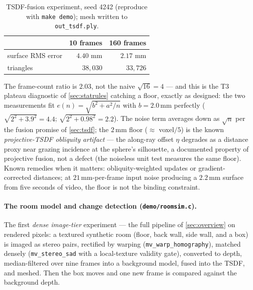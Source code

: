 \documentclass[11pt]{article}
\theoremstyle{definition}
\newcommand{\code}[1]{\texttt{#1}}
\begin{document}
\begin{table}[ht]
\centering
\begin{tabular}{lrr}
\toprule
 & 10 frames & 160 frames \\
\midrule
surface RMS error & $4.40$ mm & $2.17$ mm \\
triangles         & $38{,}030$ & $33{,}726$ \\
\bottomrule
\end{tabular}
\caption{TSDF-fusion experiment, seed 4242 (reproduce with
\code{make demo}); mesh written to \code{out\_tsdf.ply}.}
\label{tab:tsdfresults}
\end{table}

The frame-count ratio is $2.03$, not the naive $\sqrt{16}=4$ --- and
this is the T3 plateau diagnostic of \autoref{sec:statrules} catching a
floor, exactly as designed: the two measurements fit
$e(n)=\sqrt{b^2+a^2/n}$ with $b=2.0$\,mm perfectly
($\sqrt{2^2+3.9^2}=4.4$; $\sqrt{2^2+0.98^2}=2.2$). The noise term
averages down as $\sqrt n$ per the fusion promise of
\autoref{sec:tsdf}; the $2$\,mm floor ($\approx$ voxel$/5$) is the
known \emph{projective-TSDF obliquity artifact} --- the along-ray
offset $\eta$ degrades as a distance proxy near grazing incidence at
the sphere's silhouette, a documented property of projective fusion,
not a defect (the noiseless unit test measures the same floor). Known
remedies when it matters: obliquity-weighted updates or
gradient-corrected distances; at $21$\,mm-per-frame input noise
producing a $2.2$\,mm surface from five seconds of video, the floor is
not the binding constraint.

\paragraph{The room model and change detection
(\code{demo/roomsim.c}).} The first \emph{dense image-tier} experiment
--- the full pipeline of \autoref{sec:overview} on rendered pixels: a
textured synthetic room (floor, back wall, side wall, and a box) is
imaged as stereo pairs, rectified by warping
(\code{mv\_warp\_homography}), matched densely
(\code{mv\_stereo\_sad} with a local-texture validity gate), converted
to depth, median-filtered over nine frames into a background model, fused
into the TSDF, and meshed. Then the box moves and one new frame is
compared against the background depth.
\end{document}
